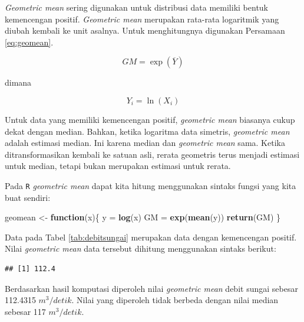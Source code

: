 \documentclass[]{book}
\newenvironment{Shaded}{\begin{snugshade}}{\end{snugshade}}
\newcommand{\KeywordTok}[1]{\textcolor[rgb]{0.13,0.29,0.53}{\textbf{#1}}}
\newcommand{\StringTok}[1]{\textcolor[rgb]{0.31,0.60,0.02}{#1}}
\newcommand{\ControlFlowTok}[1]{\textcolor[rgb]{0.13,0.29,0.53}{\textbf{#1}}}
\newcommand{\OperatorTok}[1]{\textcolor[rgb]{0.81,0.36,0.00}{\textbf{#1}}}
\newcommand{\NormalTok}[1]{#1}
\begin{document}
\emph{Geometric mean} sering digunakan untuk distribusi data memiliki
bentuk kemencengan positif. \emph{Geometric mean} merupakan rata-rata
logaritmik yang diubah kembali ke unit asalnya. Untuk menghitungnya
digunakan Persamaan \eqref{eq:geomean}.

\begin{equation}
  GM = \exp\left(\overline{Y}\right)
  \label{eq:geomean}
\end{equation}

dimana

\begin{equation}
  Y_i = \ln\left(X_i\right)
  \label{eq:geomean2}
\end{equation}

Untuk data yang memiliki kemencengan positif, \emph{geometric mean}
biasanya cukup dekat dengan median. Bahkan, ketika logaritma data
simetris, \emph{geometric mean} adalah estimasi median. Ini karena
median dan \emph{geometric mean} sama. Ketika ditransformasikan kembali
ke satuan asli, rerata geometris terus menjadi estimasi untuk median,
tetapi bukan merupakan estimasi untuk rerata.

Pada \texttt{R} \emph{geometric mean} dapat kita hitung menggunakan
sintaks fungsi yang kita buat sendiri:

\begin{Shaded}
\begin{Highlighting}[]
\NormalTok{geomean <-}\StringTok{ }\ControlFlowTok{function}\NormalTok{(x)\{}
\NormalTok{  y =}\StringTok{ }\KeywordTok{log}\NormalTok{(x)}
\NormalTok{  GM =}\StringTok{ }\KeywordTok{exp}\NormalTok{(}\KeywordTok{mean}\NormalTok{(y))}
  \KeywordTok{return}\NormalTok{(GM)}
\NormalTok{\}}
\end{Highlighting}
\end{Shaded}

Data pada Tabel \ref{tab:debitsungai} merupakan data dengan kemencengan
positif. Nilai \emph{geometric mean} data tersebut dihitung menggunakan
sintaks berikut:

\begin{Shaded}
\end{Shaded}

\begin{verbatim}
## [1] 112.4
\end{verbatim}

Berdasarkan hasil komputasi diperoleh nilai \emph{geometric mean} debit
sungai sebesar 112.4315 \(m^3/detik\). Nilai yang diperoleh tidak
berbeda dengan nilai median sebesar 117 \(m^3/detik\).
\end{document}
